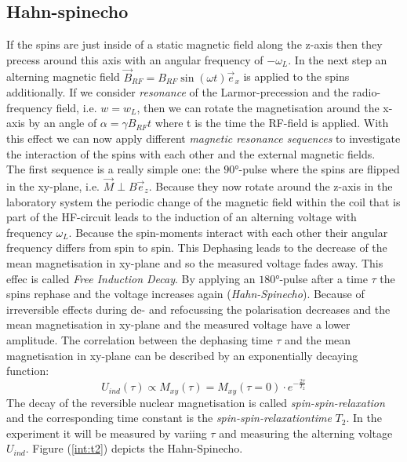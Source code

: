 	\subsection{Hahn-spinecho} \label{int:secHahn}
		If the spins are just inside of a static magnetic field along the z-axis then they precess around this axis with an angular frequency of  $-\omega_L$. In the next step an alterning magnetic field $\vec{B}_{RF} = B_{RF}\sin(\omega t)\vec{e}_x$ is applied to the spins additionally. If we consider \textit{resonance} of the Larmor-precession and the radio-frequency field, i.e. $w = w_L$, then we can rotate the magnetisation around the x-axis by an angle of $\alpha = \gamma B_{RF}t$ where t is the time the RF-field is applied. With this effect we can now apply different \textit{magnetic resonance sequences} to investigate the interaction of the spins with each other and the external magnetic fields.\\
		The first sequence is a really simple one: the $90 \unit{°}$-pulse where the spins are flipped in the xy-plane, i.e. $\vec{M} \perp B\vec{e}_z$. Because they now rotate around the z-axis in the laboratory system the periodic change of the magnetic field within the coil that is part of the HF-circuit leads to the induction of an alterning voltage with frequency $\omega_L$. Because the spin-moments interact with each other their angular frequency differs from spin to spin. This Dephasing leads to the decrease of the mean magnetisation in xy-plane and so the measured voltage fades away. This effec is called \textit{Free Induction Decay}. By applying an $180\unit{°}$-pulse after a time $\tau$ the spins rephase and the voltage increases again (\textit{Hahn-Spinecho}). Because of irreversible effects during de- and refocussing the polarisation decreases and the mean magnetisation in xy-plane and the measured voltage have a lower amplitude. The correlation between the dephasing time $\tau$ and the mean magnetisation in xy-plane can be described by an exponentially decaying function:
		\begin{equation}
			U_{ind}(\tau) \propto M_{xy}(\tau) = M_{xy}(\tau = 0) \cdot e^{-\frac{2\tau}{T_2}}
		\end{equation} 
		The decay of the reversible nuclear magnetisation is called \textit{spin-spin-relaxation} and the corresponding time constant is the \textit{spin-spin-relaxationtime} $T_2$. In the experiment it will be measured by variing $\tau$ and measuring the alterning voltage $U_{ind}$. Figure (\ref{int:t2}) depicts the Hahn-Spinecho.
